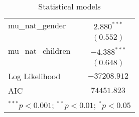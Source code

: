 \begin{table}
\begin{center}
\begin{tabular}{l c}
mu\_nat\_gender    & $2.880^{***}$   \\
                   & $(0.552)$       \\
mu\_nat\_children  & $-4.388^{***}$  \\
                   & $(0.648)$       \\
\hline
Log Likelihood     & $-37208.912$    \\
AIC                & $74451.823$     \\
\hline
\multicolumn{2}{l}{\scriptsize{$^{***}p<0.001$; $^{**}p<0.01$; $^{*}p<0.05$}}
\end{tabular}
\caption{Statistical models}
\label{table:coefficients}
\end{center}
\end{table}
